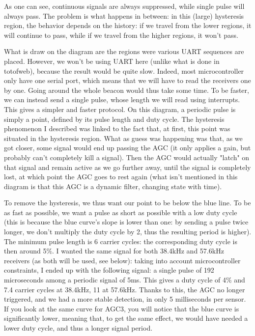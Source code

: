 \documentclass[a4paper,11pt]{article}
\begin{document}
As one can see, continuous signals are always suppressed, while single pulse will always pass. The problem is what happens in between: in this (large) hysteresis region, the behavior depends on the history: if we travel from the lower regions, it will continue to pass, while if we travel from the higher regions, it won't pass.

What is draw on the diagram are the regions were various UART sequences are placed. However, we won't be using UART here (unlike what is done in totofweb), because the result would be quite slow. Indeed, most microcontroller only have one serial port, which means that we will have to read the receivers one by one. Going around the whole beacon would thus take some time. To be faster, we can instead send a single pulse, whose length we will read using interrupts. This gives a simpler and faster protocol. On this diagram, a periodic pulse is simply a point, defined by its pulse length and duty cycle. The hysteresis phenomenon I described was linked to the fact that, at first, this point was situated in the hysteresis region. What as guess was happening was that, as we got closer, some signal would end up passing the AGC (it only applies a gain, but probably can't completely kill a signal). Then the AGC would actually "latch" on that signal and remain active as we go further away, until the signal is completely lost, at which point the AGC goes to rest again (what isn't mentioned in this diagram is that this AGC is a dynamic filter, changing state with time).

To remove the hysteresis, we thus want our point to be below the blue line. To be as fast as possible, we want a pulse as short as possible with a low duty cycle (this is because the blue curve's slope is lower than one: by sending a pulse twice longer, we don't multiply the duty cycle by 2, thus the resulting period is higher). The minimum pulse length is 6 carrier cycles: the corresponding duty cycle is then around 5\%. I wanted the same signal for both 38.4kHz and 57.6kHz receivers (as both will be used, see below): taking into account microcontroller constraints, I ended up with the following signal: a single pulse of 192 microseconds among a periodic signal of 5ms. This gives a duty cycle of 4\% and 7.4 carrier cycles at 38.4kHz, 11 at 57.6kHz. Thanks to this, the AGC no longer triggered, and we had a more stable detection, in only 5 milliseconds per sensor. If you look at the same curve for AGC3, you will notice that the blue curve is significantly lower, meaning that, to get the same effect, we would have needed a lower duty cycle, and thus a longer signal period.
\end{document}
